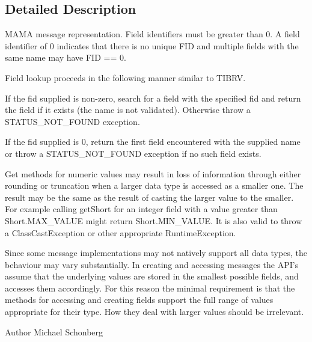 \subsection{Detailed Description}
MAMA message representation. Field identifiers must be greater than 0. A field identifier of 0 indicates that there is no unique FID and multiple fields with the same name may have FID == 0.

Field lookup proceeds in the following manner similar to TIBRV.
\begin{DoxyItemize}
\item If the fid supplied is non-\/zero, search for a field with the specified fid and return the field if it exists (the name is not validated). Otherwise throw a STATUS\_\-NOT\_\-FOUND exception.
\item If the fid supplied is 0, return the first field encountered with the supplied name or throw a STATUS\_\-NOT\_\-FOUND exception if no such field exists.
\end{DoxyItemize}

Get methods for numeric values may result in loss of information through either rounding or truncation when a larger data type is accessed as a smaller one. The result may be the same as the result of casting the larger value to the smaller. For example calling {\ttfamily getShort} for an integer field with a value greater than {\ttfamily Short.MAX\_\-VALUE} might return {\ttfamily Short.MIN\_\-VALUE}. It is also valid to throw a {\ttfamily ClassCastException} or other appropriate {\ttfamily RuntimeException}.

Since some message implementations may not natively support all data types, the behaviour may vary substantially. In creating and accessing messages the API's assume that the underlying values are stored in the smallest possible fields, and accesses them accordingly. For this reason the minimal requirement is that the methods for accessing and creating fields support the full range of values appropriate for their type. How they deal with larger values should be irrelevant.

\begin{DoxyAuthor}{Author}
Michael Schonberg 
\end{DoxyAuthor}


